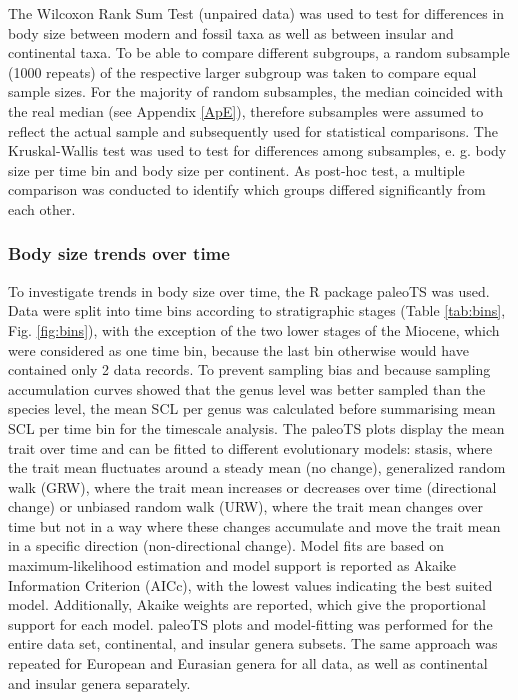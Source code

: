 The Wilcoxon Rank Sum Test (unpaired data) was used to test for differences in body size between modern and fossil taxa as well as between insular and continental taxa. To be able to compare different subgroups, a random subsample (1000 repeats) of the respective larger subgroup was taken to compare equal sample sizes. For the majority of random subsamples, the median coincided with the real median (see Appendix \ref{ApE}), therefore subsamples were assumed to reflect the actual sample and subsequently used for statistical comparisons.
The Kruskal-Wallis test was used to test for differences among subsamples, e. g. body size per time bin and body size per continent.
As post-hoc test, a multiple comparison \citep{Siegel1988} was conducted to identify which groups differed significantly from each other.



\subsubsection{Body size trends over time}
To investigate trends in body size over time, the R package paleoTS \citep{Hunt2015a} was used. Data were split into time bins according to stratigraphic stages (Table \ref{tab:bins}, Fig. \ref{fig:bins}), with the exception of the two lower stages of the Miocene, which were considered as one time bin, because the last bin otherwise would have contained only 2 data records. To prevent sampling bias and because sampling accumulation curves showed that the genus level was better sampled than the species level, the mean SCL per genus was calculated before summarising mean SCL per time bin for the timescale analysis. The paleoTS plots display the mean trait over time and can be fitted to different evolutionary models: stasis, where the trait mean fluctuates around a steady mean (no change), generalized random walk (GRW), where the trait mean increases or decreases over time (directional change) or unbiased random walk (URW), where the trait mean changes over time but not in a way where these changes accumulate and move the trait mean in a specific direction (non-directional change). Model fits are based on maximum-likelihood estimation and model support is reported as Akaike Information Criterion (AICc), with the lowest values indicating the best suited model. Additionally, Akaike weights are reported, which give the proportional support for each model. paleoTS plots and model-fitting was performed for the entire data set, continental, and insular genera subsets. The same approach was repeated for European and Eurasian genera for all data, as well as continental and insular genera separately.


